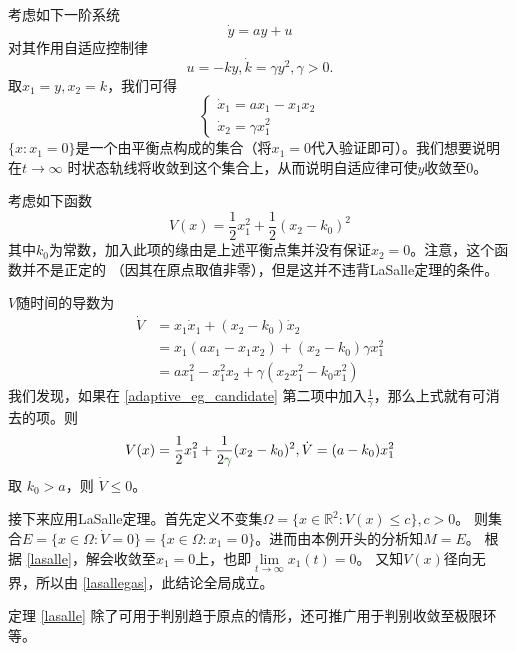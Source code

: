 \begin{example}[利用LaSalle定理判别自适应控制的收敛性]
	考虑如下一阶系统
  \[ \dot{y} = a  y + u \]
  对其作用自适应控制律
  \[ u = - k  y, \dot{k} = \gamma y^2, \gamma > 0. \]
  取$x_1 = y, x_2 = k$，我们可得
  \[ \left\{\begin{array}{l}
       \dot{x}_1 = a  x_1 - x_1 x_2\\
       \dot{x}_2 = \gamma x^2_1
     \end{array}\right. \]
  $\{x:x_1 = 0\}$是一个由平衡点构成的集合（将$x_1=0$代入验证即可）。我们想要说明在$t \rightarrow \infty$
  时状态轨线将收敛到这个集合上，从而说明自适应律可使$y$收敛至$0$。
  
  考虑如下函数
  \begin{equation}\label{adaptive_eg_candidate}
	V (x) = \frac{1}{2} x^2_1 + \frac{1}{2} (x_2 - k_0)^2
  \end{equation}
  其中$k_0$为常数，加入此项的缘由是上述平衡点集并没有保证$x_2=0$。注意，这个函数并不是正定的
  （因其在原点取值非零），但是这并不违背LaSalle定理的条件。
  
  $V$随时间的导数为
  \begin{align*}
    \dot{V} & =  x_1 \dot{x}_1 +  (x_2 - k_0) \dot{x}_2\\
    & =  x_1 (a  x_1 - x_1 x_2) + (x_2 - k_0) \gamma x^2_1\\
	&= ax_1^2-x_1^2x_2+\gamma(x_2x_1^2-k_0x_1^2)
  \end{align*}
  我们发现，如果在 \eqref{adaptive_eg_candidate} 第二项中加入$\frac{1}{\gamma}$，那么上式就有可消去的项。则
  \[V (x) = \frac{1}{2} x^2_1 + \frac{1}{2\textcolor{structurecolor}{\gamma}} (x_2 - k_0)^2, \dot{V}  =  (a - k_0)  x^2_1\]
  取 $k_0 > a$，则 $\dot{V} \leq 0$。

  接下来应用LaSalle定理。首先定义不变集$\Omega = \{ x \in \mathbb{R}^2 : V (x) \leq c \},c>0$。
  则集合$E =\{ x \in \Omega :\dot{V}= 0 \}= \{ x \in \Omega : x_1 = 0 \}$。进而由本例开头的分析知$M = E$。
  根据 \ref{lasalle}，解会收敛至$x_1=0$上，也即$\lim\limits_{t \rightarrow \infty} x_1 (t) = 0$。
  又知$V(x)$径向无界，所以由 \ref{lasallegas}，此结论全局成立。
\end{example}
定理 \ref{lasalle} 除了可用于判别趋于原点的情形，还可推广用于判别收敛至极限环等。
